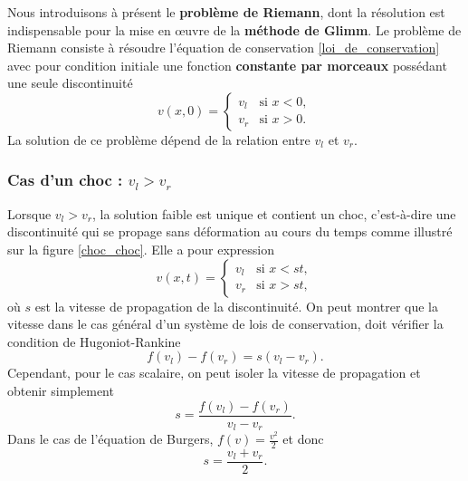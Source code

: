 \documentclass[11pt,a4paper]{article}
\begin{document}
Nous introduisons à présent le \textbf{problème de Riemann}, dont la résolution est indispensable pour la mise en \oe uvre de la \textbf{méthode de Glimm}.
Le problème de Riemann consiste à résoudre l'équation de conservation \eqref{loi_de_conservation} avec pour condition initiale une fonction \textbf{constante par morceaux} possédant une seule discontinuité
\begin{equation}
	v(x,0) = \left\{
     \begin{array}{rl}
      v_l & \text{si } x < 0,\\
      v_r & \text{si } x > 0.
     \end{array}
     \right.
\end{equation}
La solution de ce problème dépend de la relation entre $v_l$ et $v_r$.

\subsubsection{Cas d'un choc : $v_l > v_r$}

Lorsque $v_l > v_r$, la solution faible est unique et contient un choc, c'est-à-dire une discontinuité qui se propage sans déformation au cours du temps comme illustré sur la figure \ref{choc_choc}. Elle a pour expression
\begin{equation}
	v(x,t) = \left\{
     \begin{array}{rl}
      v_l & \text{si } x < st,\\
      v_r & \text{si } x > st,
     \end{array}
     \right.
\end{equation}
où $s$ est la vitesse de propagation de la discontinuité.
On peut montrer \cite{leveque1992numerical} que la vitesse dans le cas général d'un système de lois de conservation, doit vérifier la condition de Hugoniot-Rankine
\begin{equation}\label{hugoniot_rankine_condition}
	f(v_l) - f(v_r) = s\left(v_l - v_r\right).
\end{equation}
Cependant, pour le cas scalaire, on peut isoler la vitesse de propagation et obtenir simplement
\begin{equation}
	 s = \frac{f(v_l) - f(v_r)}{v_l - v_r}.
\end{equation} 
Dans le cas de l'équation de Burgers, $f(v) = \frac{v^2}{2}$ et donc 
\begin{equation}
	s = \frac{v_l + v_r}{2}.
\end{equation}
\end{document}
